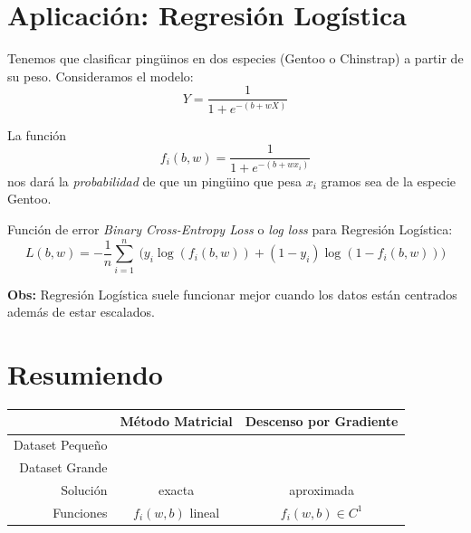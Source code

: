 \documentclass[aspectratio=169, usenames,dvipsnames]{beamer}
\newcommand{\tick}{\ding{51}}
\newcommand{\cross}{\ding{55}}
\begin{document}
\section{Aplicación: Regresión Logística}

\begin{frame}
    Tenemos que clasificar pingüinos en dos especies (Gentoo o Chinstrap) a partir de su peso. Consideramos el modelo:
    \[Y = \dfrac{1}{1 + e^{-(b + wX)}}\]

    \pause
    \vspace{0.5cm}
    La función
    \[f_i(b,w) = \dfrac{1}{1 + e^{-(b + wx_i)}}\]
    nos dará la \textit{probabilidad} de que un pingüino que pesa $x_i$ gramos sea de la especie Gentoo.
\end{frame}

\begin{frame}
    Función de error \textit{Binary Cross-Entropy Loss} o \textit{log loss} para Regresión Logística:
    \[L(b,w) = -{\frac {1}{n}}\sum _{i=1}^{n}\ {\bigg (}y_i\log (f_i(b,w))+(1-y_i)\log(1-f_i(b,w)) \bigg)\]

    \pause
    \textbf{Obs:} Regresión Logística suele funcionar mejor cuando los datos están centrados además de estar escalados.
\end{frame}

\section{Resumiendo}

\begin{frame}
    \centering
    \begin{tabular}{|r|c|c|}\hline
         & Método Matricial & Descenso por Gradiente \\\hline
        Dataset Pequeño &  \tick  & \cross \\\hline
        Dataset Grande &  \cross  & \tick \\\hline
        Solución & exacta & aproximada \\\hline
        Funciones & $f_i(w,b)$ lineal & $f_i(w,b)\in C^1$ \\\hline
    \end{tabular}
\end{frame}
\end{document}
